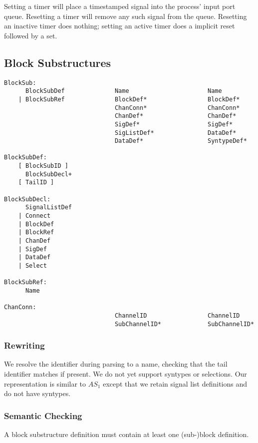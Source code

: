 Setting a timer will place a timestamped signal into the process'
input port queue. Resetting a timer will remove any such signal
from the queue. Resetting an inactive timer does nothing; setting an
active timer does a implicit reset followed by a set.

\subsection{Block Substructures}

\begin{verbatim}
BlockSub:
      BlockSubDef              Name                      Name
    | BlockSubRef              BlockDef*                 BlockDef*
                               ChanConn*                 ChanConn*
                               ChanDef*                  ChanDef*
                               SigDef*                   SigDef*
                               SigListDef*               DataDef*
                               DataDef*                  SyntypeDef*

BlockSubDef:
    [ BlockSubID ]
      BlockSubDecl+
    [ TailID ]

BlockSubDecl:
      SignalListDef
    | Connect
    | BlockDef
    | BlockRef
    | ChanDef
    | SigDef
    | DataDef
    | Select

BlockSubRef:
      Name

ChanConn:
                               ChannelID                 ChannelID
                               SubChannelID*             SubChannelID*   
\end{verbatim}

\subsubsection{Rewriting}

We resolve the identifier during parsing to a name, checking that the
tail identifier matches if present. We do not yet support syntypes or
selections. Our representation is similar to $AS_1$ except that we
retain signal list definitions and do not have syntypes.

\subsubsection{Semantic Checking}

A block substructure definition must contain at least one (sub-)block
definition. 

